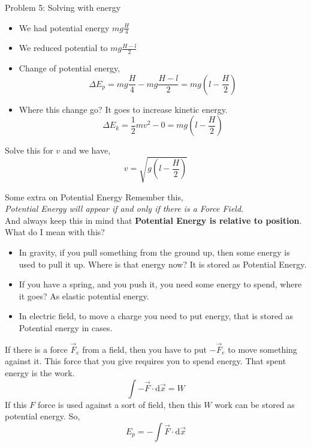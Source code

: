 \documentclass[9pt]{memoir}
\begin{document}
\begin{frame}
    {Problem 5: Solving with energy}
    \begin{itemize}
        \item We had potential energy $mg \frac{H}{4}$ 
        \item We reduced potential to $mg \frac{H-l}{2}$ 
        \item Change of potential energy, 
            \[ \Delta E_p =mg \frac{H}{4 } - mg \frac{H-l}{2} = mg \left( l - \frac{H}{2} \right)  \] 
        \item Where this change go? It goes to increase kinetic energy. 
            \[ \Delta E_k= \frac{1}{2} mv^2 - 0 = mg \left( l - \frac{H}{2} \right)  \]
        
    \end{itemize}
    Solve this for $v$ and we have, 
    \[ \boxed{ v = \sqrt{g \left(  l - \frac{H}{2} \right) } } \]
    
\end{frame}
\begin{frame}
    {Some extra on Potential Energy}
    Remember this, \\
    \emph{Potential Energy will appear if and only if there is a Force Field.}\\
    And always keep this in mind that \textbf{Potential Energy is relative to position}. \\
    What do I mean with this? 
    \begin{itemize}
        \item In gravity, if you pull something from the ground up, then some energy is used to pull it up. Where is that energy now? It is stored as Potential Energy. 
        \item If you have a spring, and you push it, you need some energy to spend, where it goes? As elastic potential energy. 
        \item In electric field, to move a  charge you need to put energy, that is stored as Potential energy in cases. 
    \end{itemize}

    If there is a force $\vec F_e$ from a field, then you have to put $- \vec F_e$ to move something against it. This force that you give requires you to spend energy. That spent energy is the work.
    \[ \int -\vec F \cdot \mathrm d \vec x = W  \]
    If this $F$ force is used against a sort of field, then this $W$ work can be stored as potential energy. So, 
    \[ E_p = - \int \vec F \cdot \mathrm d \vec x  \]
    
\end{frame}
\end{document}
